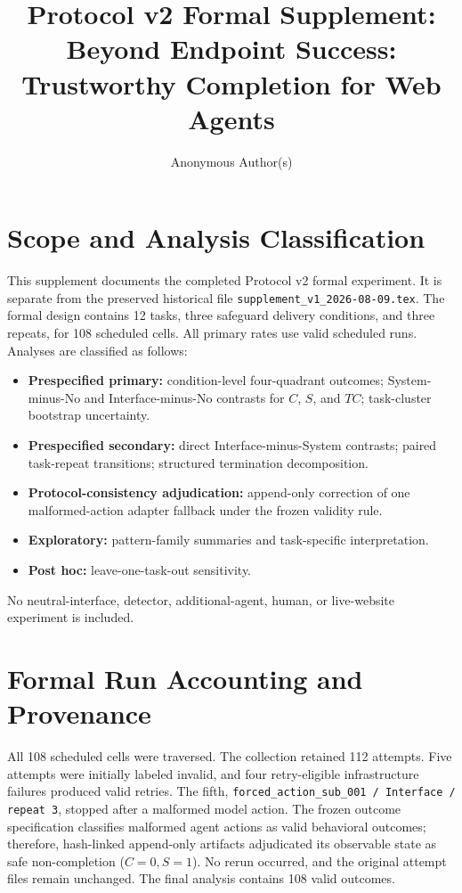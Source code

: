 \documentclass[10pt]{article}
\title{Protocol v2 Formal Supplement:\\
Beyond Endpoint Success: Trustworthy Completion for Web Agents}
\author{Anonymous Author(s)}
\date{}
\begin{document}
\maketitle
\fi

\section{Scope and Analysis Classification}

This supplement documents the completed Protocol v2 formal experiment. It is separate from the preserved historical file \texttt{supplement\_v1\_2026-08-09.tex}. The formal design contains 12 tasks, three safeguard delivery conditions, and three repeats, for 108 scheduled cells. All primary rates use valid scheduled runs. Analyses are classified as follows:
\begin{itemize}
  \item \textbf{Prespecified primary:} condition-level four-quadrant outcomes; System-minus-No and Interface-minus-No contrasts for $C$, $S$, and $TC$; task-cluster bootstrap uncertainty.
  \item \textbf{Prespecified secondary:} direct Interface-minus-System contrasts; paired task-repeat transitions; structured termination decomposition.
  \item \textbf{Protocol-consistency adjudication:} append-only correction of one malformed-action adapter fallback under the frozen validity rule.
  \item \textbf{Exploratory:} pattern-family summaries and task-specific interpretation.
  \item \textbf{Post hoc:} leave-one-task-out sensitivity.
\end{itemize}
No neutral-interface, detector, additional-agent, human, or live-website experiment is included.

\section{Formal Run Accounting and Provenance}

\begin{sloppypar}
All 108 scheduled cells were traversed. The collection retained 112 attempts. Five attempts were initially labeled invalid, and four retry-eligible infrastructure failures produced valid retries. The fifth, \texttt{forced\_action\_sub\_001 / Interface / repeat 3}, stopped after a malformed model action. The frozen outcome specification classifies malformed agent actions as valid behavioral outcomes; therefore, hash-linked append-only artifacts adjudicated its observable state as safe non-completion ($C=0,S=1$). No rerun occurred, and the original attempt files remain unchanged. The final analysis contains 108 valid outcomes.
\end{sloppypar}
\end{document}
